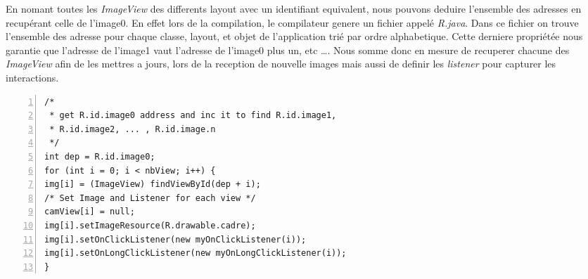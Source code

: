En nomant toutes les \textit{ImageView} des differents layout avec un
identifiant equivalent, nous pouvons deduire l'ensemble des adresses en
recupérant celle de l'image0.
En effet lors de la compilation, le compilateur genere un fichier appelé
\textit{R.java}. Dans ce fichier on trouve l'ensemble des adresse pour chaque
classe, layout, et objet de l'application trié par ordre alphabetique. Cette
derniere propriétée nous garantie que l'adresse de l'image1 vaut l'adresse de
l'image0 plus un, etc \ldots. Nous somme donc en mesure de recuperer chacune des 
\textit{ImageView} afin de les mettres a jours, lors de la reception de nouvelle
images mais aussi de definir les \textit{listener} pour capturer les
interactions.
\begin{changemargin}{0cm}{-2cm}
\begin{lstlisting}[caption={ImageView address resolver},
framexleftmargin=7mm, numbers=left] 
/*
 * get R.id.image0 address and inc it to find R.id.image1,
 * R.id.image2, ... , R.id.image.n
 */
int dep = R.id.image0;
for (int i = 0; i < nbView; i++) {
img[i] = (ImageView) findViewById(dep + i);
/* Set Image and Listener for each view */
camView[i] = null;
img[i].setImageResource(R.drawable.cadre);
img[i].setOnClickListener(new myOnClickListener(i));
img[i].setOnLongClickListener(new myOnLongClickListener(i));
}
\end{lstlisting}   
\end{changemargin}

